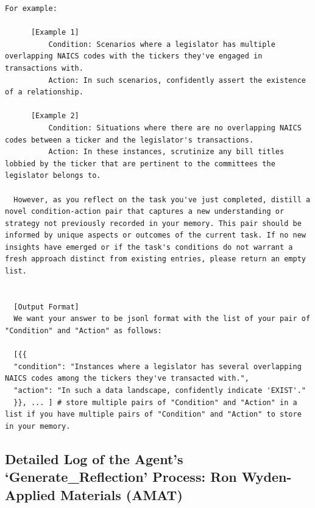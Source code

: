 \documentclass[15pt,letterpaper]{article}
\begin{document}
\begin{Verbatim}[breaklines=true, frame=single]
  For example:

      [Example 1]
          Condition: Scenarios where a legislator has multiple overlapping NAICS codes with the tickers they've engaged in transactions with.
          Action: In such scenarios, confidently assert the existence of a relationship.

      [Example 2]
          Condition: Situations where there are no overlapping NAICS codes between a ticker and the legislator's transactions.
          Action: In these instances, scrutinize any bill titles lobbied by the ticker that are pertinent to the committees the legislator belongs to.

  However, as you reflect on the task you've just completed, distill a novel condition-action pair that captures a new understanding or strategy not previously recorded in your memory. This pair should be informed by unique aspects or outcomes of the current task. If no new insights have emerged or if the task's conditions do not warrant a fresh approach distinct from existing entries, please return an empty list.


  [Output Format]
  We want your answer to be jsonl format with the list of your pair of "Condition" and "Action" as follows:

  [{{
  "condition": "Instances where a legislator has several overlapping NAICS codes among the tickers they've transacted with.",
  "action": "In such a data landscape, confidently indicate 'EXIST'."
  }}, ... ] # store multiple pairs of "Condition" and "Action" in a list if you have multiple pairs of "Condition" and "Action" to store in your memory.
\end{Verbatim}


\subsection*{Detailed Log of the Agent's `Generate\_Reflection' Process: Ron Wyden-Applied Materials (AMAT)}\label{app:log:reflect}
\end{document}

